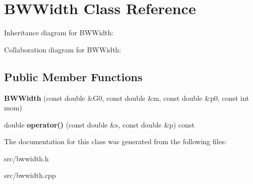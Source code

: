 \hypertarget{class_b_w_width}{}\section{B\+W\+Width Class Reference}
\label{class_b_w_width}


Inheritance diagram for B\+W\+Width\+:


Collaboration diagram for B\+W\+Width\+:
\subsection*{Public Member Functions}
\begin{DoxyCompactItemize}
\item 
\hypertarget{class_b_w_width_a58a6698dcade7acb6de239658f473b10}{}{\bfseries B\+W\+Width} (const double \&G0, const double \&m, const double \&p0, const int mom)\label{class_b_w_width_a58a6698dcade7acb6de239658f473b10}

\item 
\hypertarget{class_b_w_width_a585ac7fce41ecaf959dcf63c315ecdd1}{}double {\bfseries operator()} (const double \&s, const double \&p) const \label{class_b_w_width_a585ac7fce41ecaf959dcf63c315ecdd1}

\end{DoxyCompactItemize}


The documentation for this class was generated from the following files\+:\begin{DoxyCompactItemize}
\item 
src/bwwidth.\+h\item 
src/bwwidth.\+cpp\end{DoxyCompactItemize}
